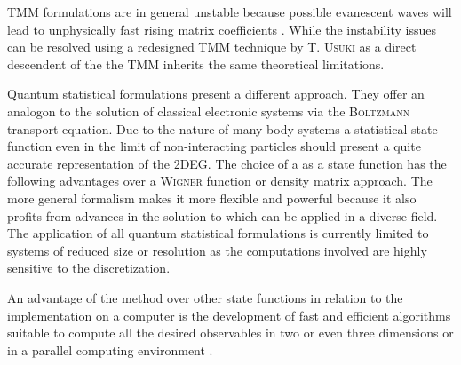TMM formulations are in general unstable because possible evanescent waves will lead to unphysically fast rising matrix coefficients \cite{PhysRevB.38.9945}.
While the instability issues can be resolved using a redesigned TMM technique by \textsc{T. Usuki} \cite{PhysRevB.50.7615}\cite{PhysRevB.52.8244} as a direct descendent of the \sdg{} the TMM inherits the same theoretical limitations.\par
Quantum statistical formulations present a different approach. They offer an analogon to the solution of classical electronic systems via the \textsc{Boltzmann} transport equation.
Due to the nature of many-body systems a statistical state function even in the limit of non-interacting particles should present a quite accurate representation of the 2DEG. The choice of a \gfnc{} as a state function has the following advantages over a \textsc{Wigner} function or density matrix approach.
The more general formalism makes it more flexible and powerful because it also profits from advances in the solution to \gfnc{} which can be applied in a diverse field.  The application of all quantum statistical formulations is currently limited to systems of reduced size or resolution as the computations involved are highly sensitive to the discretization.\par
An advantage of the \gfnc{} method over other state functions in relation to the implementation on a computer is the development of fast and efficient algorithms suitable to compute all the desired observables \cite{JApplPhys.91.2343} in two or even three dimensions or in a parallel computing environment \cite{Drouvelis2006parallel}.
